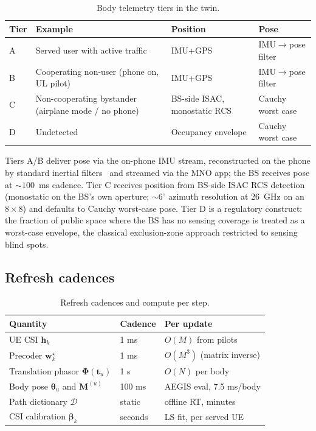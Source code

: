 \documentclass[journal,twocolumn,10pt]{IEEEtran}
\theoremstyle{definition}
\newcommand{\ww}{\mathbf{w}}
\newcommand{\hh}{\mathbf{h}}
\newcommand{\Mmat}{\mathbf{M}}
\newcommand{\Phimat}{\mathbf{\Phi}}
\newcommand{\Dict}{\mathcal{D}}
\begin{document}
\begin{table}[!t]
\centering
\caption{Body telemetry tiers in the twin.}
\label{tab:tiers}
\begin{tabular}{@{}p{}p{}p{}p{}@{}}
\toprule
Tier & Example & Position & Pose \\
\midrule
A & Served user with active traffic           & IMU+GPS     & IMU$\to$pose filter \\
B & Cooperating non-user (phone on, UL pilot) & IMU+GPS     & IMU$\to$pose filter \\
C & Non-cooperating bystander (airplane mode / no phone) & BS-side ISAC, monostatic RCS & Cauchy worst case \\
D & Undetected                                 & Occupancy envelope & Cauchy worst case \\
\bottomrule
\end{tabular}
\end{table}

Tiers A/B deliver pose via the on-phone IMU stream,
reconstructed on the phone by standard inertial
filters~\cite{Madgwick2011,VQF2022} and streamed via the MNO
app; the BS receives pose at $\sim 100$~ms cadence. Tier C
receives position from BS-side ISAC RCS detection (monostatic on
the BS's own aperture; $\sim 6^{\circ}$ azimuth resolution at
26~GHz on an $8\times 8$) and defaults to Cauchy worst-case
pose. Tier D is a regulatory construct: the fraction of public
space where the BS has no sensing coverage is treated as a
worst-case envelope, the classical exclusion-zone approach
restricted to sensing blind spots.

\subsection{Refresh cadences}

\begin{table}[!t]
\centering
\caption{Refresh cadences and compute per step.}
\label{tab:cadence}
\begin{tabular}{@{}p{}p{}p{}@{}}
\toprule
Quantity & Cadence & Per update \\
\midrule
UE CSI $\hh_k$                             & 1 ms & $O(M)$ from pilots \\
Precoder $\ww_k^\star$                     & 1 ms & $O(M^3)$ (matrix inverse) \\
Translation phasor $\Phimat(\mathbf{t}_u)$ & 1 s  & $O(N)$ per body \\
Body pose $\bm\theta_u$ and $\Mmat^{(u)}$  & 100 ms & AEGIS eval, 7.5 ms/body \\
Path dictionary $\Dict$                    & static & offline RT, minutes \\
CSI calibration $\bm\beta_k$               & seconds & LS fit, per served UE \\
\bottomrule
\end{tabular}
\end{table}
\end{document}
